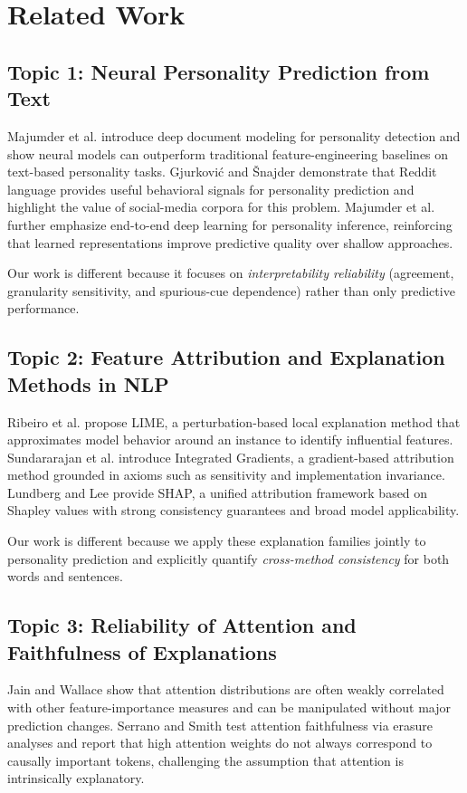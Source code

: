 \documentclass[sigplan,screen]{acmart}
\begin{document}
\section{Related Work}
\subsection{Topic 1: Neural Personality Prediction from Text}
Majumder et al. \cite{majumder2017deep} introduce deep document modeling for personality detection and show neural models can outperform traditional feature-engineering baselines on text-based personality tasks. Gjurkovi\'c and \v{S}najder \cite{gjurkovic2018reddit} demonstrate that Reddit language provides useful behavioral signals for personality prediction and highlight the value of social-media corpora for this problem. Majumder et al. \cite{majumder2020deep} further emphasize end-to-end deep learning for personality inference, reinforcing that learned representations improve predictive quality over shallow approaches.

Our work is different because it focuses on \textit{interpretability reliability} (agreement, granularity sensitivity, and spurious-cue dependence) rather than only predictive performance.

\subsection{Topic 2: Feature Attribution and Explanation Methods in NLP}
Ribeiro et al. \cite{ribeiro2016lime} propose LIME, a perturbation-based local explanation method that approximates model behavior around an instance to identify influential features. Sundararajan et al. \cite{sundararajan2017axiomatic} introduce Integrated Gradients, a gradient-based attribution method grounded in axioms such as sensitivity and implementation invariance. Lundberg and Lee \cite{lundberg2017unified} provide SHAP, a unified attribution framework based on Shapley values with strong consistency guarantees and broad model applicability.

Our work is different because we apply these explanation families jointly to personality prediction and explicitly quantify \textit{cross-method consistency} for both words and sentences.

\subsection{Topic 3: Reliability of Attention and Faithfulness of Explanations}
Jain and Wallace \cite{jain2019attention} show that attention distributions are often weakly correlated with other feature-importance measures and can be manipulated without major prediction changes. Serrano and Smith \cite{serrano2019attention} test attention faithfulness via erasure analyses and report that high attention weights do not always correspond to causally important tokens, challenging the assumption that attention is intrinsically explanatory.
\end{document}
